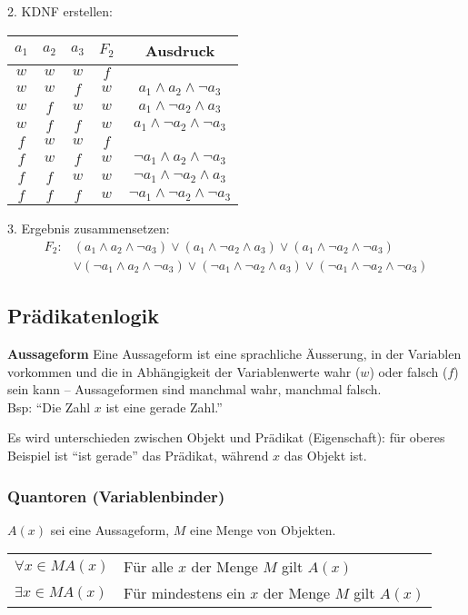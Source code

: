 2. KDNF erstellen:\\
\begin{center}
	\begin{tabular}{c|c|c||c||c}
		$a_1$ 	&$a_2$ 	& $a_3$	 	& $F_2$ & Ausdruck\\\hline
		$w$ 	& $w$	& $w$		& $f$	& \\ 
		$w$ 	& $w$	& $f$		& $w$	& $a_1 \wedge a_2 \wedge \neg a_3$\\ 
		$w$ 	& $f$	& $w$		& $w$	& $a_1 \wedge \neg a_2 \wedge a_3$\\ 
		$w$ 	& $f$	& $f$		& $w$	& $a_1 \wedge \neg a_2 \wedge \neg a_3$\\ 
		$f$ 	& $w$	& $w$		& $f$	& \\
		$f$ 	& $w$	& $f$		& $w$	& $\neg a_1 \wedge a_2 \wedge \neg a_3$\\ 
		$f$ 	& $f$	& $w$		& $w$	& $\neg a_1 \wedge \neg a_2 \wedge a_3$\\ 
		$f$ 	& $f$	& $f$		& $w$	& $\neg a_1 \wedge \neg a_2 \wedge \neg a_3$\\ 
	\end{tabular}
\end{center}

3. Ergebnis zusammensetzen:
\begin{align*} F_2:& (a_1 \wedge a_2 \wedge \neg a_3) \vee (a_1 \wedge \neg a_2 \wedge a_3) \vee (a_1 \wedge \neg a_2 \wedge \neg a_3)\\ 
& \vee (\neg a_1 \wedge a_2 \wedge \neg a_3) \vee (\neg a_1 \wedge \neg a_2 \wedge a_3) \vee (\neg a_1 \wedge \neg a_2 \wedge \neg a_3)
\end{align*}

\subsection{Prädikatenlogik}
\textbf{Aussageform} Eine Aussageform ist eine sprachliche Äusserung, in 
der Variablen vorkommen und die in Abhängigkeit der Variablenwerte wahr ($w$) oder falsch ($f$) 
sein kann -- Aussageformen sind manchmal wahr, manchmal falsch.\\
Bsp: \enquote{Die Zahl $x$ ist eine gerade Zahl.}

Es wird unterschieden zwischen Objekt und Prädikat (Eigenschaft): für oberes Beispiel ist \enquote{ist gerade}
das Prädikat, während $x$ das Objekt ist.

\subsubsection{Quantoren (Variablenbinder)}
$A(x)$ sei eine Aussageform, $M$ eine Menge von Objekten.
\settowidth{\MyLenA}{$\forall x \in M A(x))$~~}
\begin{tabular}{@{}p{\the\MyLenA}%
				@{}p{\linewidth-\the\MyLenA}}
	$\forall x \in M A(x)$ & Für alle $x$ der Menge $M$ gilt $A(x)$\\
	$\exists x \in M A(x)$ & Für mindestens ein $x$ der Menge $M$ gilt $A(x)$\\
\end{tabular}

